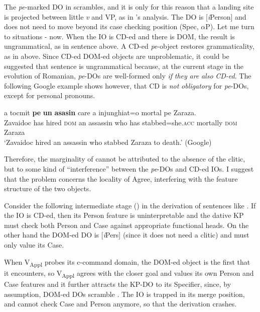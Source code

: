 \documentclass[output=paper,colorlinks,citecolor=brown,nonflat]{./langscibook}
\begin{document}
The \textit{pe}{}-marked DO in  scrambles, and it is only for this reason that a landing site is projected between little \textit{v} and VP, as in \citeauthor{López2012}’s analysis. The DO is [\textit{i}Person] and does not need to move beyond its case checking position (Spec, ${\alpha}$P). Let me turn to situations - now. When the IO is CD-ed and there is DOM, the result is ungrammatical, as in sentence  above. A CD-ed \textit{pe}{}-object restores grammaticality, as in  above. Since CD-ed DOM-ed objects are unproblematic, it could be suggested that sentence  is ungrammatical because, at the current stage in the evolution of Romanian, \textit{pe}{}-DOs are well-formed only \textit{if} \textit{they} \textit{are} \textit{also} \textit{CD-ed}. The following Google example shows however, that CD is \textit{not} \textit{obligatory} for \textit{pe}{}-DOs, except for personal pronouns.

\ea%
   \label{ex:cornilescu:31}
    {a} {tocmit} \textbf{pe} \textbf{un} \textbf{asasin} {care} {a} {injunghiat=o} {mortal} {pe} {Zaraza}.\\
       Zavaidoc has hired \textsc{dom} an assassin who has stabbed=she.\textsc{acc} mortally \textsc{dom} Zaraza\\
   \glt ‘Zavaidoc hired an assassin who stabbed Zaraza to death.’ (Google)
   \z

Therefore, the marginality of  cannot be attributed to the absence of the clitic, but to some kind of “interference” between the \textit{pe}{}-DOs and CD-ed IOs. I suggest that the problem concerns the locality of Agree, interfering with the feature structure of the two objects.

Consider the following intermediate stage () in the derivation of sentences like . If the IO is CD-ed, then its Person feature is uninterpretable and the dative KP must check both Person and Case against appropriate functional heads. On the other hand the DOM-ed DO is [\textit{i}Pers] (since it does not need a clitic) and must only value its Case.

When V\textsubscript{Appl} probes its c-command domain, the DOM-ed object is the first that it encounters, so V\textsubscript{Appl} agrees with the closer goal and values its own Person and Case features and it further attracts the KP-DO to its Specifier, since, by assumption, DOM-ed DOs scramble \citep{López2012}. The IO is trapped in its merge position, and cannot check Case and Person anymore, so that the derivation crashes.
\end{document}
